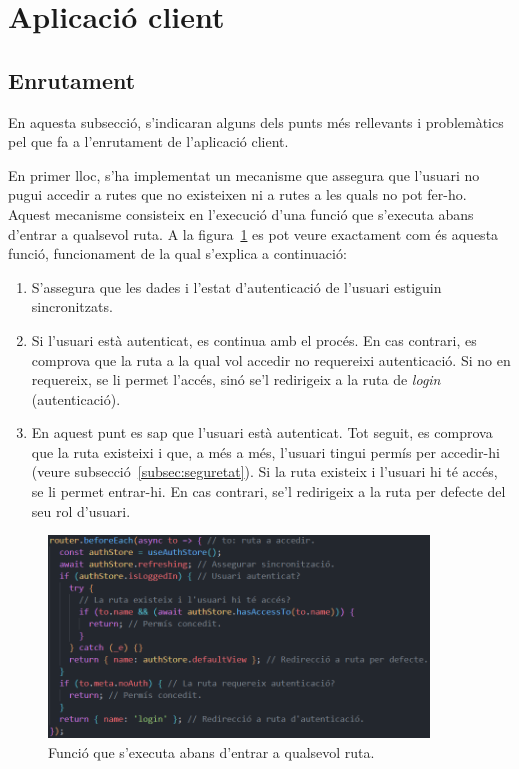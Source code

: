 \documentclass[a4paper,12pt]{ThesisStyle}
\begin{document}
\section{Aplicació client}
\label{sec:imp_client}

\subsection{Enrutament}
\label{subsec:enrutament_client}

En aquesta subsecció, s'indicaran alguns dels punts més rellevants i problemàtics pel que fa a l'enrutament de l'aplicació client.

En primer lloc, s'ha implementat un mecanisme que assegura que l'usuari no pugui accedir a rutes que no existeixen ni a rutes a les quals no pot fer-ho. Aquest mecanisme consisteix en l'execució d'una funció que s'executa abans d'entrar a qualsevol ruta. A la figura~\ref{img:beforeEach} es pot veure exactament com és aquesta funció, funcionament de la qual s'explica a continuació:
\begin{enumerate}
  \item S'assegura que les dades i l'estat d'autenticació de l'usuari estiguin sincronitzats.
  \item Si l'usuari està autenticat, es continua amb el procés. En cas contrari, es comprova que la ruta a la qual vol accedir no requereixi autenticació. Si no en requereix, se li permet l'accés, sinó se'l redirigeix a la ruta de \textit{login} (autenticació).
  \item En aquest punt es sap que l'usuari està autenticat. Tot seguit, es comprova que la ruta existeixi i que, a més a més, l'usuari tingui permís per accedir-hi (veure subsecció~\ref{subsec:seguretat}). Si la ruta existeix i l'usuari hi té accés, se li permet entrar-hi. En cas contrari, se'l redirigeix a la ruta per defecte del seu rol d'usuari.
\end{enumerate}

\begin{figure}[H]
  \centering
  \includegraphics[width=0.9\textwidth]{assets/code/enrutamentClient/beforeEach.png}
  \caption{\label{img:beforeEach} Funció que s'executa abans d'entrar a qualsevol ruta.}
\end{figure}
\end{document}
